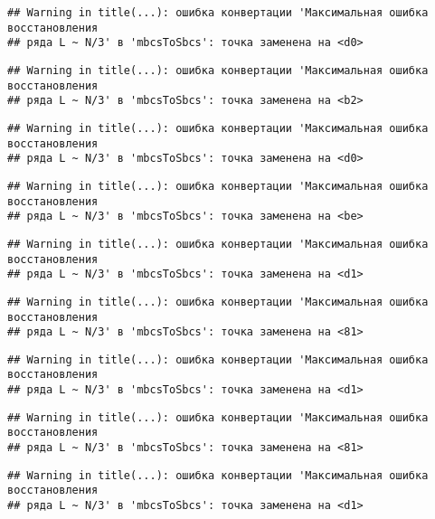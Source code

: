 \documentclass[
]{article}
\begin{document}
\begin{verbatim}
## Warning in title(...): ошибка конвертации 'Максимальная ошибка восстановления
## ряда L ~ N/3' в 'mbcsToSbcs': точка заменена на <d0>
\end{verbatim}

\begin{verbatim}
## Warning in title(...): ошибка конвертации 'Максимальная ошибка восстановления
## ряда L ~ N/3' в 'mbcsToSbcs': точка заменена на <b2>
\end{verbatim}

\begin{verbatim}
## Warning in title(...): ошибка конвертации 'Максимальная ошибка восстановления
## ряда L ~ N/3' в 'mbcsToSbcs': точка заменена на <d0>
\end{verbatim}

\begin{verbatim}
## Warning in title(...): ошибка конвертации 'Максимальная ошибка восстановления
## ряда L ~ N/3' в 'mbcsToSbcs': точка заменена на <be>
\end{verbatim}

\begin{verbatim}
## Warning in title(...): ошибка конвертации 'Максимальная ошибка восстановления
## ряда L ~ N/3' в 'mbcsToSbcs': точка заменена на <d1>
\end{verbatim}

\begin{verbatim}
## Warning in title(...): ошибка конвертации 'Максимальная ошибка восстановления
## ряда L ~ N/3' в 'mbcsToSbcs': точка заменена на <81>
\end{verbatim}

\begin{verbatim}
## Warning in title(...): ошибка конвертации 'Максимальная ошибка восстановления
## ряда L ~ N/3' в 'mbcsToSbcs': точка заменена на <d1>
\end{verbatim}

\begin{verbatim}
## Warning in title(...): ошибка конвертации 'Максимальная ошибка восстановления
## ряда L ~ N/3' в 'mbcsToSbcs': точка заменена на <81>
\end{verbatim}

\begin{verbatim}
## Warning in title(...): ошибка конвертации 'Максимальная ошибка восстановления
## ряда L ~ N/3' в 'mbcsToSbcs': точка заменена на <d1>
\end{verbatim}
\end{document}
